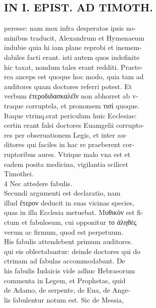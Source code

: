 \documentclass{article}
\begin{document}
\begin{pages}
\section*{IN I. EPIST. AD TIMOTH. \\
                }
peresse: nam mox infra desperatos ipsis no- \\
                minibus traducit, Alexandrum et Hymenaeum \\
                indubie quia hi iam plane reprobi et inemem- \\
                dabiles facti erant. isti autem quos indefinite \\
                hic taxat, nondum tales erant redditi. Praete- \\
                rea anceps est quoque hoc modo, quia tam ad \\
                auditores quam doctores referri potest. Et \\
                verbum ἐτεροδιδασκαλέῖν non abhorret ab v- \\
                traque corruptela, et pronomem τισὶ quoque. \\
                Itaque vtrinq.erat periculum huic Ecclesiae: \\
                certin erant falsi doctores Euamgelii corrupto- \\
                res per obseruationem Legis, et inter au- \\
                ditores qui faciles in hac re praeberent cor- \\
                ruptoribus aures. Vtrique malo vna est et \\
                eadem posita medicina, vigilantia scilicet \\
                Timothei. \\
                4 Nec attedere fabulis. \\
                Secundi argumenti est declaratio, nam \\
                illud ἕτερον deducit in suas vicinas species, \\
                quas in illa Ecclesia metuebat. Μυθικὸν est fi- \\
                ctum et fabulosum, cui opponitur το ἀληθὲς \\
                verum ac firmum, quod est perpetuum. \\
                His fabulis attendebent primum auditores. \\
                qui eis oblectabantur: deinde doctores qui do \\
                ctrinam ad fabulas accommodabant. De \\
                his fabulis Iudaicis vide adhuc Hebraeorum \\
                commenta in Legem, et Prophetas, quid \\
                de Adamo, de serpente, de Eua, de Ange- \\
                lis fabulentur notum est. Sic de Messia, \\
                

\end{pages}
\end{document}
